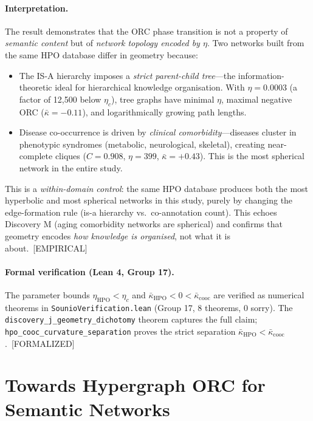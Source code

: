 \documentclass[11pt,a4paper]{article}
\newcommand{\kbar}{\bar{\kappa}}
\begin{document}
\paragraph{Interpretation.}
The result demonstrates that the ORC phase transition is not a property of \emph{semantic content} but of \emph{network topology encoded by $\eta$}. Two networks built from the same HPO database differ in geometry because:
\begin{itemize}
  \item The IS-A hierarchy imposes a \emph{strict parent-child tree}---the information-theoretic ideal for hierarchical knowledge organisation. With $\eta = 0.0003$ (a factor of 12,500 below $\eta_c$), tree graphs have minimal $\eta$, maximal negative ORC ($\kbar = -0.11$), and logarithmically growing path lengths.
  \item Disease co-occurrence is driven by \emph{clinical comorbidity}---diseases cluster in phenotypic syndromes (metabolic, neurological, skeletal), creating near-complete cliques ($C = 0.908$, $\eta = 399$, $\kbar = +0.43$). This is the most spherical network in the entire study.
\end{itemize}
This is a \emph{within-domain control}: the same HPO database produces both the most hyperbolic and most spherical networks in this study, purely by changing the edge-formation rule (is-a hierarchy vs.\ co-annotation count). This echoes Discovery M (aging comorbidity networks are spherical) and confirms that geometry encodes \emph{how knowledge is organised}, not what it is about.~[EMPIRICAL]

\paragraph{Formal verification (Lean 4, Group 17).}
The parameter bounds $\eta_{\text{HPO}} < \eta_c$ and $\kbar_{\text{HPO}} < 0 < \kbar_{\text{cooc}}$ are verified as numerical theorems in \texttt{SounioVerification.lean} (Group 17, 8 theorems, 0 sorry). The \texttt{discovery\_j\_geometry\_dichotomy} theorem captures the full claim; \texttt{hpo\_cooc\_curvature\_separation} proves the strict separation $\kbar_{\text{HPO}} < \kbar_{\text{cooc}}$.~[FORMALIZED]

\section{Towards Hypergraph ORC for Semantic Networks}
\label{sec:hypergraph}
\end{document}
